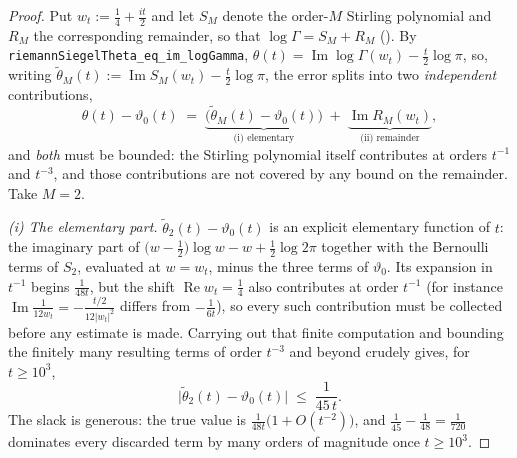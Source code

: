 \begin{proof}
\leanok
{}
Put $w_{t}:=\tfrac14+\tfrac{it}2$ and let $S_{M}$ denote the order-$M$ Stirling polynomial and
$R_{M}$ the corresponding remainder, so that $\log\Gamma=S_{M}+R_{M}$
().  By \texttt{riemannSiegelTheta\_eq\_im\_logGamma},
$\theta(t)=\operatorname{Im}\log\Gamma(w_{t})-\tfrac t2\log\pi$, so, writing
$\widetilde\theta_{M}(t):=\operatorname{Im}S_{M}(w_{t})-\tfrac t2\log\pi$, the error splits into
two \emph{independent} contributions,
\[
  \theta(t)-\vartheta_{0}(t)
  \;=\;\underbrace{\bigl(\widetilde\theta_{M}(t)-\vartheta_{0}(t)\bigr)}_{\text{(i) elementary}}
  \;+\;\underbrace{\operatorname{Im}R_{M}(w_{t})}_{\text{(ii) remainder}} ,
\]
and \emph{both} must be bounded: the Stirling polynomial itself contributes at orders $t^{-1}$
and $t^{-3}$, and those contributions are not covered by any bound on the remainder.  Take
$M=2$.

\emph{(i) The elementary part.}  $\widetilde\theta_{2}(t)-\vartheta_{0}(t)$ is an explicit
elementary function of $t$: the imaginary part of
$\bigl(w-\tfrac12\bigr)\log w-w+\tfrac12\log2\pi$ together with the Bernoulli terms of $S_{2}$,
evaluated at $w=w_{t}$, minus the three terms of $\vartheta_{0}$.  Its expansion in $t^{-1}$
begins $\tfrac1{48t}$, but the shift $\operatorname{Re}w_{t}=\tfrac14$ also contributes at order
$t^{-1}$ (for instance $\operatorname{Im}\tfrac1{12w_{t}}=-\tfrac{t/2}{12\lvert w_{t}\rvert^{2}}$
differs from $-\tfrac1{6t}$), so every such contribution must be collected before any
estimate is made.  Carrying out that finite computation and bounding the finitely many
resulting terms of order $t^{-3}$ and beyond crudely gives, for $t\ge10^{3}$,
\[
  \bigl\lvert\widetilde\theta_{2}(t)-\vartheta_{0}(t)\bigr\rvert\;\le\;\frac1{45\,t}.
\]
The slack is generous: the true value is $\tfrac1{48t}\bigl(1+O(t^{-2})\bigr)$, and
$\tfrac1{45}-\tfrac1{48}=\tfrac1{720}$ dominates every discarded term by many orders of
magnitude once $t\ge10^{3}$.


\end{proof}
